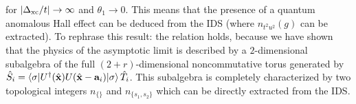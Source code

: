 \documentclass[
    10pt,
    aps,
    prb,
	longbibliography,
    twocolumn,
    floatfix,
    superscriptaddress,
]{revtex4-2}
\begin{document}
for $| \Delta_\mathrm{xc} / t| \to \infty$ and $\theta_1 \to 0 $.
This means that the presence of a quantum anomalous Hall effect can be deduced from the IDS (where $n_{t^2 u^2}(g)$ can be extracted).
To rephrase this result: the relation holds, because we have shown that the physics of the asymptotic limit is described by a $2$-dimensional subalgebra of the full $(2+r)$-dimensional noncommutative torus generated by $	\hat{S}_i = \braket{\sigma |
U^\dagger ( \hat{\mathbf{x}}) U( \hat{\mathbf{x}} - \mathbf{a}_i) | \sigma } \hat{T}_i $.
This subalgebra is completely characterized by two topological integers $n_{\lbrace \rbrace}$ and $n_{\lbrace s_1, s_2 \rbrace}$ which can be directly extracted from the IDS.



\clearpage

\hfuzz=280pt
\end{document}
